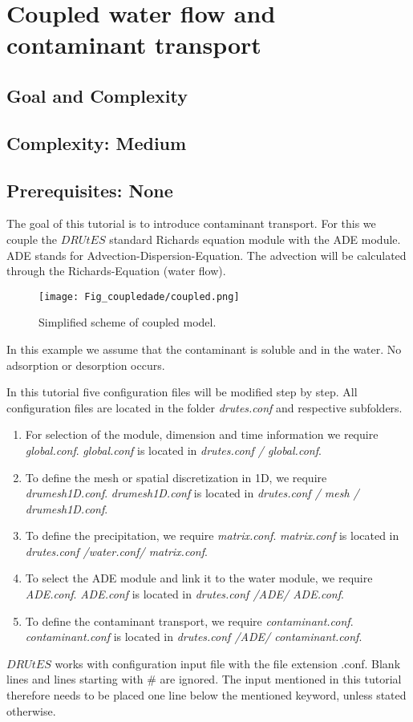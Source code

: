 \section{Coupled water flow and contaminant transport}
\subsection{Goal and Complexity}
\subsection*{Complexity: Medium}

\subsection*{Prerequisites: None}

The goal of this tutorial is to introduce contaminant transport. For this we couple the $DRUtES$ standard Richards equation module with the ADE module. ADE stands for Advection-Dispersion-Equation. The advection will be calculated through the Richards-Equation (water flow).

\begin{figure}[!h]
\centering
\texttt{[image: Fig\_coupledade/coupled.png]}
\caption{Simplified scheme of coupled model.}
\end{figure}

In this example we assume that the contaminant is soluble and in the water. No adsorption or desorption occurs. 

In this tutorial five configuration files will be modified step by step. All configuration files are located in the folder \emph{drutes.conf} and respective subfolders. \begin{enumerate}
\item For selection of the module, dimension and time information we require \emph{global.conf}.  \emph{global.conf} is located in \emph{drutes.conf / global.conf}. 
\item To define the mesh or spatial discretization in 1D,  we require \emph{drumesh1D.conf}. \emph{drumesh1D.conf} is located in \emph{drutes.conf / mesh / drumesh1D.conf}. 
\item To define the precipitation, we require \emph{matrix.conf}. \emph{matrix.conf} is located in \emph{drutes.conf /water.conf/ matrix.conf}. 
\item To select the ADE module and link it to the water module, we require \emph{ADE.conf}. \emph{ADE.conf} is located in \emph{drutes.conf /ADE/ ADE.conf}. 
\item To define the contaminant transport, we require \emph{contaminant.conf}. \emph{contaminant.conf} is located in \emph{drutes.conf /ADE/ contaminant.conf}. 
\end{enumerate}
$DRUtES$ works with configuration input file with the file extension .conf. Blank lines and lines starting with \# are ignored. The input mentioned in this tutorial therefore needs to be placed one line below the mentioned keyword, unless stated otherwise. 

